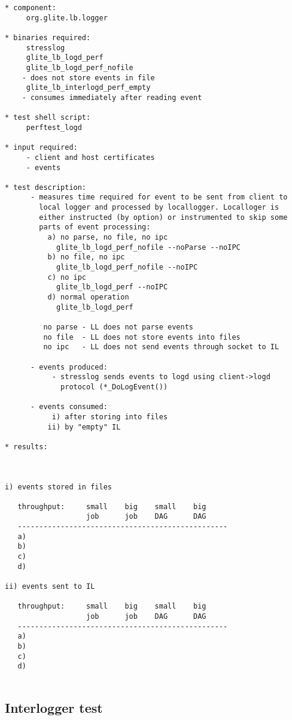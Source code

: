 \begin{verbatim}
* component:
     org.glite.lb.logger

* binaries required:
     stresslog
     glite_lb_logd_perf
     glite_lb_logd_perf_nofile
	- does not store events in file
     glite_lb_interlogd_perf_empty
	- consumes immediately after reading event

* test shell script:
     perftest_logd

* input required:
     - client and host certificates
     - events

* test description:
      - measures time required for event to be sent from client to
        local logger and processed by locallogger. Localloger is
        either instructed (by option) or instrumented to skip some
        parts of event processing:
	      a) no parse, no file, no ipc
		    glite_lb_logd_perf_nofile --noParse --noIPC
	      b) no file, no ipc
		    glite_lb_logd_perf_nofile --noIPC
	      c) no ipc
		    glite_lb_logd_perf --noIPC
	      d) normal operation
		    glite_lb_logd_perf

         no parse - LL does not parse events 
         no file  - LL does not store events into files
         no ipc   - LL does not send events through socket to IL

      - events produced:
           - stresslog sends events to logd using client->logd
             protocol (*_DoLogEvent())

      - events consumed:
           i) after storing into files
          ii) by "empty" IL
        
* results:



i) events stored in files

   throughput:     small    big    small    big 
                   job      job    DAG      DAG 
   -------------------------------------------------
   a)
   b)
   c)
   d)

ii) events sent to IL

   throughput:     small    big    small    big 
                   job      job    DAG      DAG 
   -------------------------------------------------
   a)
   b)
   c)
   d)


\end{verbatim}

\subsection{Interlogger test}

